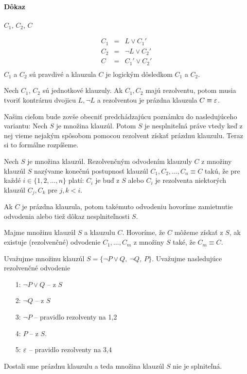 \paragraph{Dôkaz} $C_1$, $C_2$, $C$


$$
\begin{array}{lll}
C_1 &= &L \lor C_1' \\
C_2 &=& \neg L \lor C_2' \\
C   &=& C_1' \lor C_2'	\\
\end{array}
$$
$C_1$ a $C_2$ sú pravdivé a klauzula $C$ je logickým dôsledkom $C_1$ a $C_2$.

\stopFIXME

\begin{poznamka}
    Nech $C_1$, $C_2$ sú jednotkové klauzuly. Ak $C_1,C_2$ majú
    rezolventu, potom musia tvoriť kontrárnu dvojicu $L, \neg L$
    a rezolventou je prázdna klauzula $C \equiv \varepsilon$.
\end{poznamka}

Našim cieľom bude zovše obecniť predchádzajúcu poznámku do
nasledujúceho variantu: Nech $S$ je množina klauzúl. Potom $S$ je
nesplniteľná práve vtedy keď z nej vieme nejakým spôsobom pomocou
rezolvent získať prázdnu klauzulu.
Teraz si to formálne rozpíšeme.

\begin{definicia}
    Nech $S$ je množina klauzúl.
    Rezolvenčným odvodením klauzuly $C$ z množiny klauzúl $S$
    nazývame konečnú postupnosť klauzúl $C_1, C_2, \ldots, C_n \equiv C$ takú,
    že pre každé $i \in \{1,2,\dots,n\}$ platí:
    $C_i$ je buď z $S$ alebo $C_i$ je rezolventa niektorých klauzúl
    $C_j, C_k$ pre $j, k < i$.

    Ak $C$ je prázdna klauzula, potom takémuto odvodeniu hovoríme 
    zamietnutie odvodenia alebo tiež dôkaz nesplniteľnosti $S$.
\end{definicia}

\begin{definicia}
    Majme množinu klauzúl $S$ a klauzulu $C$.
    Hovoríme, že $C$ môžeme získať z $S$,
    ak existuje (rezolvenčné) odvodenie $C_1, \dots, C_m$ z množiny $S$ také, že
    $C_m \equiv C$.
\end{definicia}

\begin{priklad}
    Uvažujme množinu klauzúl $S=\{\neg P \lor Q,\ \neg Q,\ P\}$.
    Uvažujme nasledujúce rezolvenčné odvodenie
    \begin{itemize} 
	\item[1:] $ \neg P \lor Q $  -- z $S$
	\item[2:] $ \neg Q $ -- z $S$
	\item[3:] $ \neg P $ -- pravidlo rezolventy na 1,2
	\item[4:] $ P $ -- z $S$.
        \item[5:] $\varepsilon$ -- pravidlo rezolventy na 3,4
    \end{itemize}
    Dostali sme prázdnu klauzulu a teda množina klauzúl $S$ nie je
    splniteľná.
\end{priklad}


